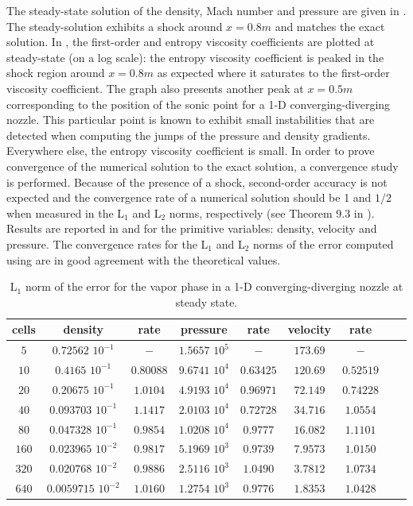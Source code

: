 %
The steady-state solution of the density, Mach number and pressure are given in . The steady-solution exhibits a shock around $x=0.8m$ and matches the exact solution. In , the first-order and entropy viscosity coefficients are plotted at steady-state (on a log scale): the entropy viscosity coefficient is peaked in the shock region around $x=0.8m$ as expected where it saturates to the first-order viscosity coefficient. The graph also presents another peak at $x=0.5m$  corresponding to the position of the sonic point for a 1-D converging-diverging nozzle. This particular point is known to exhibit small instabilities that are detected when computing the jumps of the pressure and density gradients. Everywhere else, the entropy  viscosity coefficient is small. In order to prove convergence of the numerical solution to the exact solution, a convergence study is performed. Because of the presence of a shock, second-order accuracy is not expected and the convergence rate of a numerical solution should be 1 and $1/2$ when measured in the L$_1$ and L$_2$ norms, respectively (see Theorem 9.3 in \cite{convergence_book}). Results are reported in  and  for the primitive variables: density, velocity and pressure. The convergence rates for the L$_1$ and L$_2$ norms of the error computed using  are in good agreement with the theoretical values.
%
\begin{table}[!htbp]
\begin{center}
 \caption{\label{tbl:l1_norm_vap} L$_1$ norm of the error for the vapor phase in a 1-D converging-diverging nozzle at steady state.}
 \begin{tabular}{|c|c|c|c|c|c|c|c|c|}
 \hline
cells & density              & rate      & pressure          & rate      & velocity & rate      \\ \hline
$5$  & $0.72562$   $10^{-1}$ & $-$       & $1.5657$ $10^{5}$ & $-$       & $173.69$ & $-$       \\ \hline
$10$ & $0.4165$    $10^{-1}$ & $0.80088$ & $9.6741$ $10^{4}$ & $0.63425$ & $120.69$ & $0.52519$ \\ \hline
$20$ & $0.20675$   $10^{-1}$ & $1.0104$  & $4.9193$ $10^{4}$ & $0.96971$ & $72.149$ & $0.74228$ \\ \hline
$40$ & $0.093703$  $10^{-1}$ & $1.1417$  & $2.0103$ $10^{4}$ & $0.72728$ & $34.716$ & $1.0554$  \\ \hline
$80$ & $0.047328$  $10^{-1}$ & $0.9854$  & $1.0208$ $10^{4}$ & $0.9777$  & $16.082$ & $1.1101$  \\ \hline
$160$& $0.023965$  $10^{-2}$ & $0.9817$  & $5.1969$ $10^{3}$ & $0.9739$  & $7.9573$ & $1.0150$  \\ \hline
$320$& $0.020768$  $10^{-2}$ & $0.9886$  & $2.5116$ $10^{3}$ & $1.0490$  & $3.7812$ & $1.0734$  \\ \hline
$640$& $0.0059715$ $10^{-2}$ & $1.0160$  & $1.2754$ $10^{3}$ & $0.9776$  & $1.8353$ & $1.0428$  \\ \hline
\end{tabular}
\end{center}
\nonumber
\end{table}
